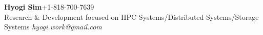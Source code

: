 {\textbf{\Large Hyogi Sim}\hfill{\small +1-818-700-7639}}\\
{\small
{Research \& Development focused on HPC Systems/Distributed Systems/Storage Systems}
    \hfill{\emph{\small hyogi.work@gmail.com}}\\
}

